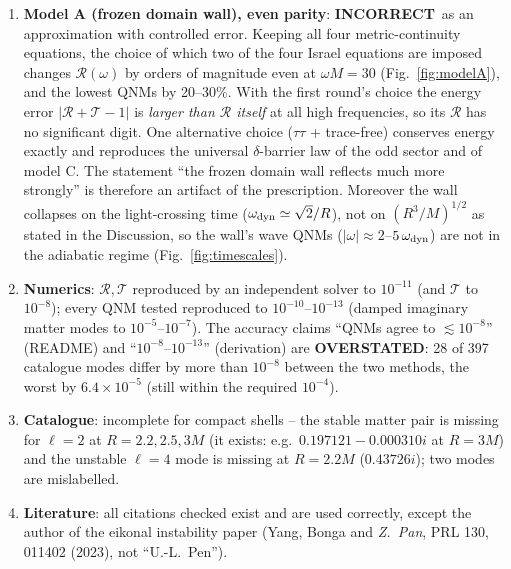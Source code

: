 \documentclass[11pt,a4paper]{article}
\newcommand{\NO}{\textcolor{red!75!black}{\textbf{INCORRECT}}}
\newcommand{\OVER}{\textcolor{orange!85!black}{\textbf{OVERSTATED}}}
\begin{document}
\begin{enumerate}
round, is correct.
\item \textbf{Model A (frozen domain wall), even parity}: \NO\ as an approximation with controlled error.
Keeping all four metric-continuity equations, the choice of which two of the four Israel equations are imposed
changes $\mathcal R(\omega)$ by orders of magnitude even at $\omega M=30$ (Fig.~\ref{fig:modelA}), and the lowest
QNMs by 20--30\%. With the first round's choice the energy error $|\mathcal R+\mathcal T-1|$ is \emph{larger than
$\mathcal R$ itself} at all high frequencies, so its $\mathcal R$ has no significant digit. One alternative choice
($\tau\tau$ + trace-free) conserves energy exactly and reproduces the universal $\delta$-barrier law of the odd
sector and of model C. The statement ``the frozen domain wall reflects much more strongly'' is therefore an
artifact of the prescription. Moreover the wall collapses on the light-crossing time
($\omega_{\rm dyn}\simeq\sqrt2/R$), not on $(R^3/M)^{1/2}$ as stated in the Discussion, so the wall's wave QNMs
($|\omega|\approx2$--$5\,\omega_{\rm dyn}$) are not in the adiabatic regime (Fig.~\ref{fig:timescales}).
\item \textbf{Numerics}: $\mathcal R,\mathcal T$ reproduced by an independent solver to $10^{-11}$ (and $\mathcal T$
to $10^{-8}$); every QNM tested reproduced to $10^{-10}$--$10^{-13}$ (damped imaginary matter modes to
$10^{-5}$--$10^{-7}$). The accuracy claims ``QNMs agree to $\lesssim10^{-8}$'' (README) and ``$10^{-8}$--$10^{-13}$''
(derivation) are \OVER: 28 of 397 catalogue modes differ by more than $10^{-8}$ between the two methods, the worst
by $6.4\times10^{-5}$ (still within the required $10^{-4}$).
\item \textbf{Catalogue}: incomplete for compact shells -- the stable matter pair is missing for $\ell=2$ at
$R=2.2,2.5,3M$ (it exists: e.g.\ $0.197121-0.000310i$ at $R=3M$) and the unstable $\ell=4$ mode is missing at $R=2.2M$
($0.43726i$); two modes are mislabelled.
\item \textbf{Literature}: all citations checked exist and are used correctly, except the author of the eikonal
instability paper (Yang, Bonga and \emph{Z.~Pan}, PRL 130, 011402 (2023), not ``U.-L.~Pen'').
\end{enumerate}
\end{document}
